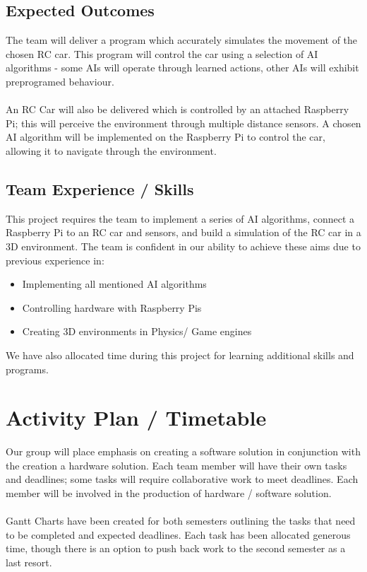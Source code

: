 \documentclass[8pt]{article}
\begin{document}
\subsection{Expected Outcomes}
 The team will deliver a program which accurately simulates the movement of the chosen RC car. This program will control the car using a selection of AI algorithms - some AIs will operate through learned actions, other AIs will exhibit preprogramed behaviour. 
\\\\
An RC Car will also be delivered which is controlled by an attached Raspberry Pi; this will perceive the environment through multiple distance sensors. A chosen AI algorithm will be implemented on the Raspberry Pi to control the car, allowing it to navigate through the environment.


\subsection{Team Experience / Skills}
This project requires the team to implement a series of AI algorithms, connect a Raspberry Pi to an RC car and sensors, and build a simulation of the RC car in a 3D environment. The team is confident in our ability to achieve these aims due to previous experience in:

\begin{itemize}
	\item Implementing all mentioned AI algorithms
	\item Controlling hardware with Raspberry Pis
	\item Creating 3D environments in Physics/ Game engines
	
\end{itemize}
We have also allocated time during this project for learning additional skills and programs.

\section{Activity Plan / Timetable}
Our group will place emphasis on creating a software solution in conjunction with the creation a hardware solution. Each team member will have their own tasks and deadlines; some tasks will require collaborative work to meet deadlines. Each member will be involved in the production of hardware / software solution.
\\\\
Gantt Charts have been created for both semesters outlining the tasks that need to be completed and expected deadlines. Each task has been allocated generous time, though there is an option to push back work to the second semester as a last resort.
\end{document}
